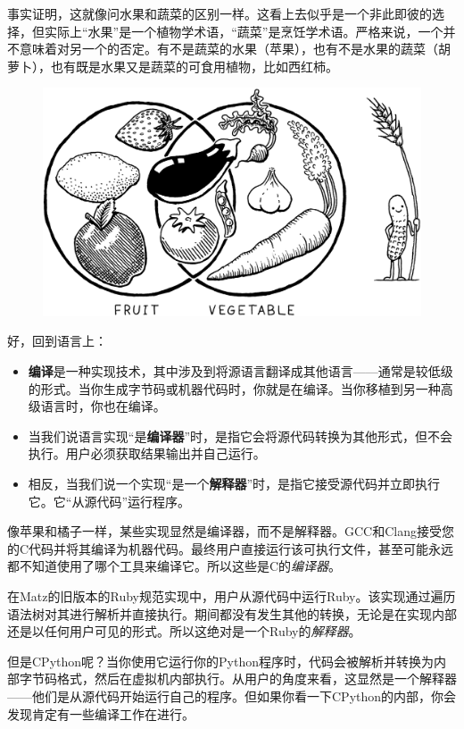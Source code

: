 \documentclass[cn,11pt,chinese]{elegantbook}
\begin{document}
事实证明，这就像问水果和蔬菜的区别一样。这看上去似乎是一个非此即彼的选择，但实际上“水果”是一个植物学术语，“蔬菜”是烹饪学术语。严格来说，一个并不意味着对另一个的否定。有不是蔬菜的水果（苹果），也有不是水果的蔬菜（胡萝卜），也有既是水果又是蔬菜的可食用植物，比如西红柿。

\begin{figure}[htbp]
  \centering
  \includegraphics[width=\textwidth]{image/a-map-of-the-territory/plants.png}
\end{figure}

好，回到语言上：

\begin{itemize}
  \item \textbf{编译}是一种实现技术，其中涉及到将源语言翻译成其他语言——通常是较低级的形式。当你生成字节码或机器代码时，你就是在编译。当你移植到另一种高级语言时，你也在编译。
  \item 当我们说语言实现“是\textbf{编译器}”时，是指它会将源代码转换为其他形式，但不会执行。用户必须获取结果输出并自己运行。
  \item 相反，当我们说一个实现“是一个\textbf{解释器}”时，是指它接受源代码并立即执行它。它“从源代码”运行程序。
\end{itemize}

像苹果和橘子一样，某些实现显然是编译器，而不是解释器。GCC和Clang接受您的C代码并将其编译为机器代码。最终用户直接运行该可执行文件，甚至可能永远都不知道使用了哪个工具来编译它。所以这些是C的\textit{编译器}。

在Matz的旧版本的Ruby规范实现中，用户从源代码中运行Ruby。该实现通过遍历语法树对其进行解析并直接执行。期间都没有发生其他的转换，无论是在实现内部还是以任何用户可见的形式。所以这绝对是一个Ruby的\textit{解释器}。

但是CPython呢？当你使用它运行你的Python程序时，代码会被解析并转换为内部字节码格式，然后在虚拟机内部执行。从用户的角度来看，这显然是一个解释器——他们是从源代码开始运行自己的程序。但如果你看一下CPython的内部，你会发现肯定有一些编译工作在进行。
\end{document}

